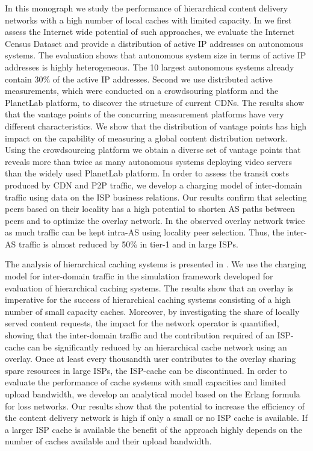 In this monograph we study the performance of hierarchical content delivery networks with a high number of local caches with limited capacity.
In  we first assess the Internet wide potential of such approaches, we evaluate the Internet Census Dataset and provide a distribution of active IP addresses on autonomous systems.
The evaluation shows that autonomous system size in terms of active IP addresses is highly heterogeneous.
The 10 largest autonomous systems already contain 30\% of the active IP addresses.
Second we use distributed active measurements, which were conducted on a crowdsouring platform and the PlanetLab platform, to discover the structure of current CDNs.
The results show that the vantage points of the concurring measurement platforms have very different characteristics.
We show that the distribution of vantage points has high impact on the capability of measuring a global content distribution network.
Using the crowdsourcing platform we obtain a diverse set of vantage points that reveals more than twice as many autonomous systems deploying video servers than the widely used PlanetLab platform.
In order to assess the transit costs produced by CDN and P2P traffic, we develop a charging model of inter-domain traffic using data on the ISP business relations.
Our results confirm that selecting peers based on their locality has a high potential to shorten AS paths between peers and to optimize the overlay network. In the observed overlay network twice as much traffic can be kept intra-AS using locality peer selection.
Thus, the inter-AS traffic is almost reduced by 50\% in tier-1 and in large ISPs.

The analysis of hierarchical caching systems is presented in .
We use the charging model for inter-domain traffic in the simulation framework developed for evaluation of hierarchical caching systems.
The results show that an overlay is imperative for the success of hierarchical caching systems consisting of a high number of small capacity caches.
Moreover, by investigating the share of locally served content requests, the impact for the network operator is quantified,
showing that the inter-domain traffic and the contribution required of an ISP-cache can be significantly reduced by an hierarchical cache network using an overlay.
Once at least every thousandth user contributes to the overlay sharing spare resources in large ISPs, the ISP-cache can be discontinued.
In order to evaluate the performance of cache systems with small capacities and limited upload bandwidth, we develop an analytical model based on the Erlang formula for loss networks.
Our results show that the potential to increase the efficiency of the content delivery network is high if only a small or no ISP cache is available.
If a larger ISP cache is available the benefit of the approach highly depends on the number of caches available and their upload bandwidth.

